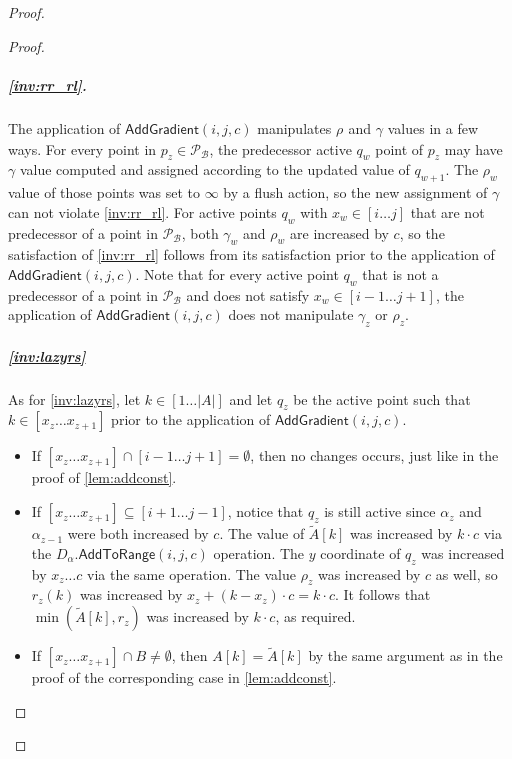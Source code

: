 \documentclass[a4paper,UKenglish,cleveref, autoref, thm-restate]{lipics-v2021}
\newcommand{\AtR}{\mathsf{AddToRange}}
\newcommand{\AG}{\mathsf{AddGradient}}
\renewcommand{\P}{\mathcal{P}}
\newcommand{\DAL}{D_{\alpha}}
\newcommand{\TA}{\tilde{A}}
\newcommand{\para}[1]{\vspace{-0.1in} \subparagraph*{#1}}
\newcommand{\B}{\mathcal{B}}
\newcommand{\ray}{r}
\newcommand{\rl}[1]{\rho_{#1}}
\begin{document}
\begin{proof}
\begin{proof}
\para{\cref{inv:rr_rl}.}
The application of $\AG(i,j,c)$ manipulates $\rl{}$ and $\gamma$ values in a few ways.
For every point in $p_z \in \P_{\B}$, the predecessor active $q_w$ point of $p_z$ may have $\gamma$ value computed and assigned according to the updated value of $q_{w+1}$.
The $\rl{w}$ value of those points was set to $\infty$ by a flush action, so the new assignment of $\gamma$ can not violate \cref{inv:rr_rl}.
For active points $q_w$ with $x_w \in [i\ldots j]$ that are not predecessor of a point in $\P_{\B}$, both $\gamma_w$ and $\rl{w}$ are increased by $c$, so the satisfaction of \cref{inv:rr_rl} follows from its satisfaction prior to the application of $\AG(i,j,c)$.
Note that for every active point $q_w$ that is not a predecessor of a point in $\P_{\B}$ and does not satisfy $x_w \in [i-1\ldots j+1]$, the application of $\AG(i,j,c)$ does not manipulate $\gamma_z$ or $\rl{z}$.
\para{\cref{inv:lazyrs}}
\fi

As for \cref{inv:lazyrs},
let $k\in [1\ldots |A|]$ and let $q_z$ be the active point such that $k\in [x_z \ldots x_{z+1}]$ prior to the application of $\AG(i,j,c)$.
\begin{itemize}
    \item If $[x_z \ldots x_{z+1}] \cap [i-1\ldots j + 1] = \emptyset$, 
 then no changes occurs, just like in the proof of \cref{lem:addconst}.
    \item If $[x_z \ldots x_{z+1}] \subseteq [i+1 \ldots j-1]$, notice that $q_z$ is still active since $\alpha_z$ and $\alpha_{z-1}$ were both increased by $c$.
    The value of $\TA[k]$ was increased by $k \cdot c$ via the $\DAL.\AtR(i,j,c)$ operation.
    The $y$ coordinate of $q_z$ was increased by $x_z \ldots c$ via the same operation. 
    The value $\rl{z}$ was increased by $c$ as well, so $\ray_z(k)$ was increased by $x_z + (k-x_z) \cdot c = k\cdot c$.
    It follows that $\min(\TA[k],\ray_z)$ was increased by $k\cdot c$, as required.
    \item If $[x_z \ldots x_{z+1}] \cap B \neq \emptyset$, then $A[k]=\TA[k]$ by the same argument as in the proof of the corresponding case in \cref{lem:addconst}.\qedhere 
\end{itemize}
\end{proof}


\end{proof}
\end{document}
